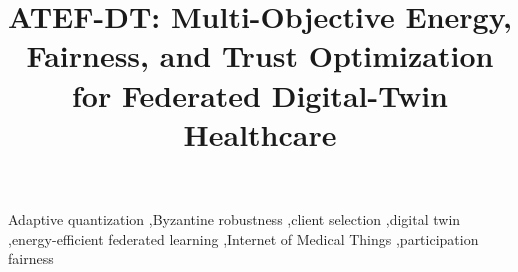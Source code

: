 \documentclass[final,5p,times]{elsarticle}
\theoremstyle{remark}
\begin{document}
\begin{frontmatter}
\title{ATEF-DT: Multi-Objective Energy, Fairness, and Trust Optimization for Federated Digital-Twin Healthcare}

\begin{abstract}

\end{abstract}

\begin{keyword}
Adaptive quantization \sep Byzantine robustness \sep client selection \sep digital twin \sep energy-efficient federated learning \sep Internet of Medical Things \sep participation fairness
\end{keyword}
\end{frontmatter}









\appendix




\end{document}
